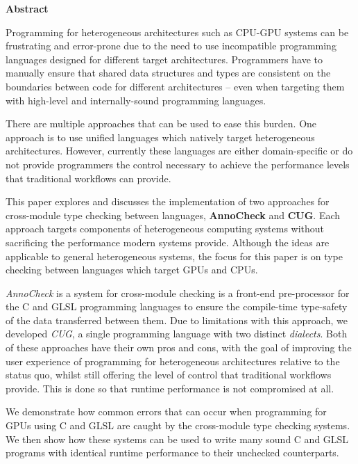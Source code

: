 \newpage
{\Huge \bf Abstract}
\vspace{24pt}






Programming for heterogeneous architectures such as CPU-GPU systems can be
frustrating and error-prone due to the need to use incompatible programming
languages designed for different target architectures. Programmers have to
manually ensure that shared data structures and types are consistent on the
boundaries between code for different architectures -- even when targeting them
with high-level and internally-sound programming languages.

There are multiple approaches that can be used to ease this burden. One
approach is to use unified languages which natively target heterogeneous
architectures. However, currently these languages are either domain-specific or
do not provide programmers the control necessary to achieve the performance
levels that traditional workflows can provide.

This paper explores and discusses the implementation of two approaches for
cross-module type checking between languages, \textbf{AnnoCheck} and
\textbf{CUG}. Each approach targets components of heterogeneous computing
systems without sacrificing the performance modern systems provide. Although
the ideas are applicable to general heterogeneous systems, the focus for this
paper is on type checking between languages which target GPUs and CPUs.

\textit{AnnoCheck} is a system for cross-module checking is a front-end
pre-processor for the C and GLSL programming languages to ensure the
compile-time type-safety of the data transferred between them. Due to
limitations with this approach, we developed \textit{CUG}, a single programming
language with two distinct \textit{dialects}. Both of these approaches have
their own pros and cons, with the goal of improving the user experience of
programming for heterogeneous architectures relative to the status quo, whilst
still offering the level of control that traditional workflows provide. This is
done so that runtime performance is not compromised at all.

We demonstrate how common errors that can occur when programming for GPUs using
C and GLSL are caught by the cross-module type checking systems. We then show
how these systems can be used to write many sound C and GLSL programs with
identical runtime performance to their unchecked counterparts.

\newpage
\vspace*{\fill}
